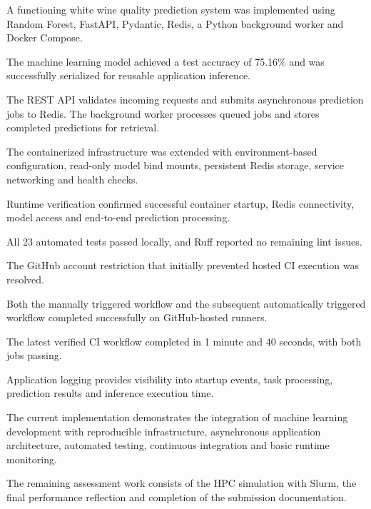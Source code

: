 \documentclass[11pt,a4paper]{article}
\begin{document}
A functioning white wine quality prediction system
was implemented using Random Forest, FastAPI,
Pydantic, Redis, a Python background worker and
Docker Compose.

The machine learning model achieved a test
accuracy of 75.16\% and was successfully
serialized for reusable application inference.

The REST API validates incoming requests and
submits asynchronous prediction jobs to Redis.
The background worker processes queued jobs and
stores completed predictions for retrieval.

The containerized infrastructure was extended
with environment-based configuration, read-only
model bind mounts, persistent Redis storage,
service networking and health checks.

Runtime verification confirmed successful
container startup, Redis connectivity, model
access and end-to-end prediction processing.

All 23 automated tests passed locally, and
Ruff reported no remaining lint issues.

The GitHub account restriction that initially
prevented hosted CI execution was resolved.

Both the manually triggered workflow and the
subsequent automatically triggered workflow
completed successfully on GitHub-hosted runners.

The latest verified CI workflow completed in
1 minute and 40 seconds, with both jobs passing.

Application logging provides visibility into
startup events, task processing, prediction
results and inference execution time.

The current implementation demonstrates the
integration of machine learning development
with reproducible infrastructure, asynchronous
application architecture, automated testing,
continuous integration and basic runtime
monitoring.

The remaining assessment work consists of
the HPC simulation with Slurm, the final
performance reflection and completion of the
submission documentation.


\clearpage

\end{document}
